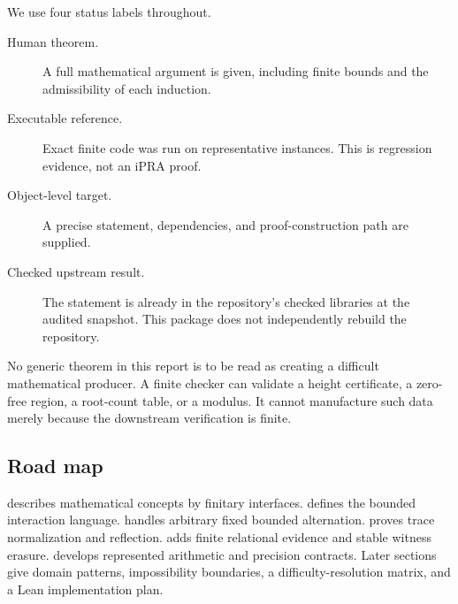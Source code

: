 We use four status labels throughout.

\begin{description}
\item[Human theorem.] A full mathematical argument is given, including finite bounds and the admissibility of each induction.
\item[Executable reference.] Exact finite code was run on representative instances.  This is regression evidence, not an iPRA proof.
\item[Object-level target.] A precise  statement, dependencies, and proof-construction path are supplied.
\item[Checked upstream result.] The statement is already in the repository's checked libraries at the audited snapshot.  This package does not independently rebuild the repository.
\end{description}

No generic theorem in this report is to be read as creating a difficult mathematical producer.  A finite checker can validate a height certificate, a zero-free region, a root-count table, or a modulus.  It cannot manufacture such data merely because the downstream verification is finite.

\subsection{Road map}

 describes mathematical concepts by finitary interfaces.   defines the bounded interaction language.   handles arbitrary fixed bounded alternation.   proves trace normalization and reflection.   adds finite relational evidence and stable witness erasure.   develops represented arithmetic and precision contracts.  Later sections give domain patterns, impossibility boundaries, a difficulty-resolution matrix, and a Lean implementation plan.
